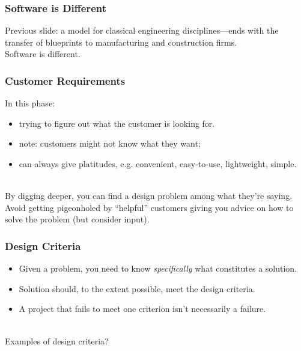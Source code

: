 \begin{frame}
\frametitle{Software is Different}

\Large 
\begin{changemargin}{1.5cm}
Previous slide: a model for classical engineering disciplines---ends with
the transfer of blueprints to manufacturing and construction
firms. \\[1em]
Software is different.
\end{changemargin}

\end{frame}

\begin{frame}
\frametitle{Customer Requirements}

\begin{changemargin}{1.5cm}
In this phase:
\begin{itemize}
\item trying to figure out what the
customer is looking for.
\item note: customers might not know what they want;
\item can always give platitudes, e.g. convenient, easy-to-use, lightweight, simple.
\end{itemize}
~\\
By digging deeper, you can find a design problem among what they're
saying.\\[1em]

Avoid getting pigeonholed by ``helpful'' customers giving you advice on how
to solve the problem (but consider input).
\end{changemargin}

\end{frame}

\begin{frame}
\frametitle{Design Criteria}

\begin{changemargin}{1.5cm}
\begin{itemize}
\item Given a problem, you need to know
\emph{specifically} what constitutes a solution. 

\item Solution should, to the extent possible, meet the design criteria.

\item A project that fails to meet one criterion isn't necessarily a failure.
\end{itemize}
~\\

\alert{Examples of design criteria?}
\end{changemargin}

\end{frame}

